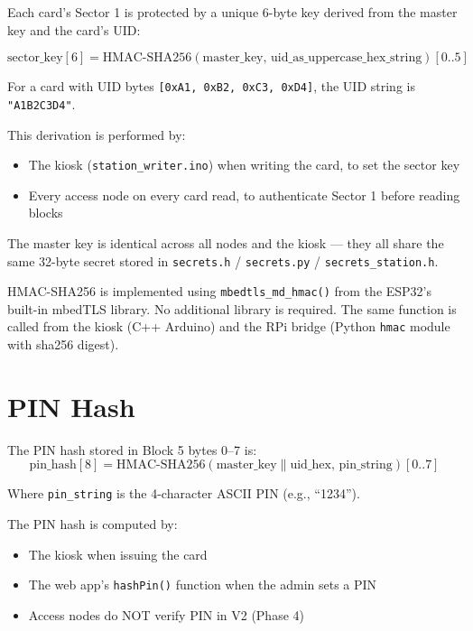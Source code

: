 Each card's Sector 1 is protected by a unique 6-byte key derived from the master key and the card's UID:

\[
\text{sector\_key}[6] = \text{HMAC-SHA256}\!\left(\text{master\_key},\, \text{uid\_as\_uppercase\_hex\_string}\right)[0..5]
\]

For a card with UID bytes \texttt{[0xA1, 0xB2, 0xC3, 0xD4]}, the UID string is \texttt{"A1B2C3D4"}.

This derivation is performed by:
\begin{itemize}[leftmargin=1.5em]
    \item The kiosk (\texttt{station\_writer.ino}) when writing the card, to set the sector key
    \item Every access node on every card read, to authenticate Sector 1 before reading blocks
\end{itemize}

The master key is identical across all nodes and the kiosk --- they all share the same 32-byte secret stored in \texttt{secrets.h} / \texttt{secrets.py} / \texttt{secrets\_station.h}.

\begin{notebox}
HMAC-SHA256 is implemented using \texttt{mbedtls\_md\_hmac()} from the ESP32's built-in mbedTLS library. No additional library is required. The same function is called from the kiosk (C++ Arduino) and the RPi bridge (Python \texttt{hmac} module with sha256 digest).
\end{notebox}

\section{PIN Hash}

The PIN hash stored in Block 5 bytes 0--7 is:
\[
\text{pin\_hash}[8] = \text{HMAC-SHA256}\!\left(\text{master\_key} \| \text{uid\_hex},\, \text{pin\_string}\right)[0..7]
\]

Where \texttt{pin\_string} is the 4-character ASCII PIN (e.g., ``1234'').

The PIN hash is computed by:
\begin{itemize}[leftmargin=1.5em]
    \item The kiosk when issuing the card
    \item The web app's \texttt{hashPin()} function when the admin sets a PIN
    \item Access nodes do NOT verify PIN in V2 (Phase 4)
\end{itemize}

